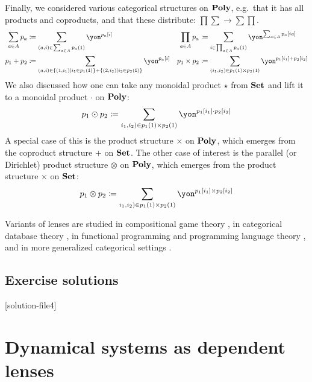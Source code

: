 \documentclass[Book-Poly]{subfiles}
\begin{document}
Finally, we considered various categorical structures on $\mathbf{Poly}$, e.g.\ that it has all products and coproducts, and that these distribute: $\prod\sum\to\sum\prod$.
\begin{align*}
	\sum_{a\in A}p_a&\coloneqq\sum_{(a,i)\in\sum_{a\in A}p_a(1)}\yon^{p_a[i]}&
	\prod_{a\in A}p_a&\coloneqq\sum_{i\in\prod_{a\in A}p_a(1)}\yon^{\sum_{a\in A}p_a[i a]}
\\
	p_1+p_2&\coloneqq\sum_{(a,i)\in\{(1,i_1)\mid i_1\in p_1(\1)\}+\{(2,i_2)\mid i_2\in p_2(\1)\}}\yon^{p_a[i]}&
	p_1\times p_2&\coloneqq\sum_{(i_1,i_2)\in p_1(1)\times p_2(1)}\yon^{p_1[i_1]+p_2[i_2]}
\end{align*}
We also discussed how one can take any monoidal product $\star$ from $\mathbf{Set}$ and lift it to a monoidal product $\cdot$ on $\mathbf{Poly}$:
\[
	p_1\odot p_2\coloneqq\sum_{i_1,i_2)\in p_1(1)\times p_2(1)}\yon^{p_1[i_1]\cdot p_2[i_2]}
\]
A special case of this is the product structure $\times$ on $\mathbf{Poly}$, which emerges from the coproduct structure $+$ on $\mathbf{Set}$. The other case of interest is the parallel (or Dirichlet) product structure $\otimes$ on $\mathbf{Poly}$, which emerges from the product structure $\times$ on $\mathbf{Set}$:
\[
	p_1\otimes p_2\coloneqq\sum_{i_1,i_2)\in p_1(1)\times p_2(1)}\yon^{p_1[i_1]\times p_2[i_2]}
\]

Variants of lenses are studied in compositional game theory \cite{hedges2016compositionality,hedges2017coherence,hedges2018limits,hedges2018morphisms}, in categorical database theory \cite{johnson2012lenses}, in functional programming and programming language theory \cite{bohannon2006relational,oconnor2011functor,abou2016reflections}, and in more generalized categorical settings \cite{gibbons2012relating,spivak2019generalized}.


\section{Exercise solutions}
{\footnotesize
}

[solution-file4]

\chapter{Dynamical systems as dependent lenses} \label{ch.poly.dyn_sys}
\end{document}
